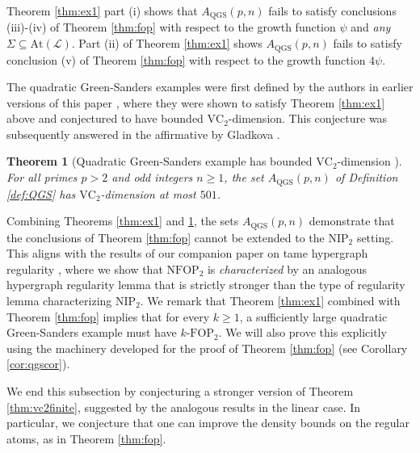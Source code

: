 \documentclass[12pt,oneside,british,a4wide]{amsart}
\newtheorem{theorem}{Theorem}[section]
\numberwithin{equation}{section}
\theoremstyle{definition}
\def\FOP{\mathrm{FOP}}
\def\NFOP{\mathrm{NFOP}}
\def\NIP{\mathrm{NIP}}
\def\VC{\mathrm{VC}}
\def\QGS{\mathrm{QGS}}
\newcommand{\calL}{\mathcal{L}}
\newcommand{\At}{{\mathrm{At}}}
\begin{document}
Theorem \ref{thm:ex1} part (i) shows that $A_{\QGS}(p,n)$ fails to satisfy conclusions (iii)-(iv) of Theorem \ref{thm:fop} with respect to the growth function $\psi$ and \emph{any} $\Sigma\subseteq  \At(\calL)$.  Part (ii) of Theorem \ref{thm:ex1} shows $A_{\QGS}(p,n)$ fails to satisfy conclusion (v) of Theorem \ref{thm:fop} with respect to the growth function $4\psi$. 

The quadratic Green-Sanders examples were first defined by the authors in earlier versions of this paper \cite{Terry.2021av2}, where they were shown to satisfy Theorem \ref{thm:ex1} above  and   conjectured to have bounded $\VC_2$-dimension.  This conjecture was subsequently answered in the affirmative by Gladkova \cite{Gladkova.2024}.

\begin{theorem}[Quadratic Green-Sanders example has bounded $\VC_2$-dimension \cite{Gladkova.2024}]\label{thm:Gladkova}
For all primes $p>2$ and odd integers $n\geq 1$, the set $A_{\QGS}(p,n)$ of Definition \ref{def:QGS} has $\VC_2$-dimension at most $501$.
\end{theorem}

Combining Theorems \ref{thm:ex1} and \ref{thm:Gladkova}, the sets $A_{\QGS}(p,n)$ demonstrate that the conclusions of Theorem \ref{thm:fop} cannot be extended to the $\NIP_2$ setting.  This aligns with the results of our companion paper on tame hypergraph regularity \cite{Terry.2021b}, where we show that $\NFOP_2$ is \emph{characterized} by an analogous hypergraph regularity lemma that is strictly stronger than the type of regularity lemma characterizing $\NIP_2$.  We remark that Theorem \ref{thm:ex1} combined with Theorem \ref{thm:fop} implies that for every $k \geq 1$, a sufficiently  large quadratic Green-Sanders example must have $k$-$\FOP_2$.  We will also prove this explicitly using the machinery developed for the proof of Theorem \ref{thm:fop} (see Corollary \ref{cor:qgscor}).   

We end this subsection by conjecturing a stronger version of Theorem \ref{thm:vc2finite}, suggested by the analogous results in the linear case. In particular,  we conjecture that one can  improve  the density bounds on the regular atoms, as in Theorem \ref{thm:fop}.
\end{document}
